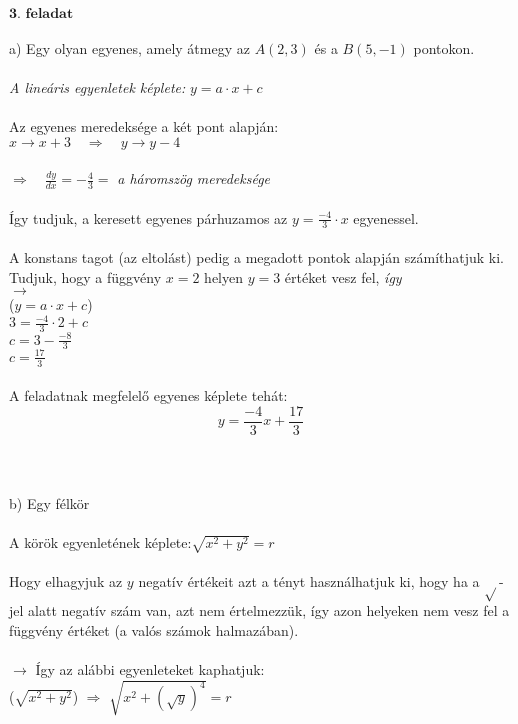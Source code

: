 \documentclass[a4paper,12pt]{article}
\begin{document}
\pagebreak
\underline{\textit{$\textbf{3. feladat} $}}
\\
\\ a) Egy olyan egyenes, amely átmegy az $A(2,3)$ és a $B(5,-1)$ pontokon.
\\
\\ \indent\textit{A lineáris egyenletek képlete:} $y = a \cdot x + c$
\\
\\ Az egyenes meredeksége a két pont alapján:
\\ $x \rightarrow x+3 \quad \Rightarrow \quad y \rightarrow y-4$
\\
\\ $\Rightarrow \quad \frac{dy}{dx} = -\frac{4}{3} =$ \textit{a háromszög meredeksége}
\\
\\ Így tudjuk, a keresett egyenes párhuzamos az $y = \frac{-4}{3} \cdot x$ egyenessel.
\\
\\ A konstans tagot (az eltolást) pedig a megadott pontok alapján számíthatjuk ki.
\\ \indent Tudjuk, hogy a függvény $x=2$ helyen $y=3$ értéket vesz fel, \textit{így}
\\ \indent $\rightarrow$
\\ \indent \indent ($y = a \cdot x+c$)
\\ \indent \indent $3 = \frac{-4}{3} \cdot 2 + c$
\\ \indent \indent $c = 3 - \frac{-8}{3}$
\\ \indent \indent $c = \frac{17}{3}$
\\
\\ A feladatnak megfelelő egyenes képlete tehát:
\\ $$y = \frac{-4}{3}x + \frac{17}{3}$$
\\
\\
\\ b) Egy félkör
\\
\\ A körök egyenletének képlete:\quad $\sqrt{x^2 + y^2} = r$
\\
\\ \indent Hogy elhagyjuk az $y$ negatív értékeit azt a tényt használhatjuk ki, hogy ha a $\sqrt{ }$-jel alatt negatív szám van, azt nem értelmezzük, így azon helyeken nem vesz fel a függvény értéket (a valós számok halmazában).
\\
\\ $\rightarrow$ Így az alábbi egyenleteket kaphatjuk:
\\ \indent ($\sqrt{x^2 + y^2}$) $\Rightarrow$ $\sqrt{x^2 + \left(\sqrt{y}\right)^4} = r$
\end{document}
